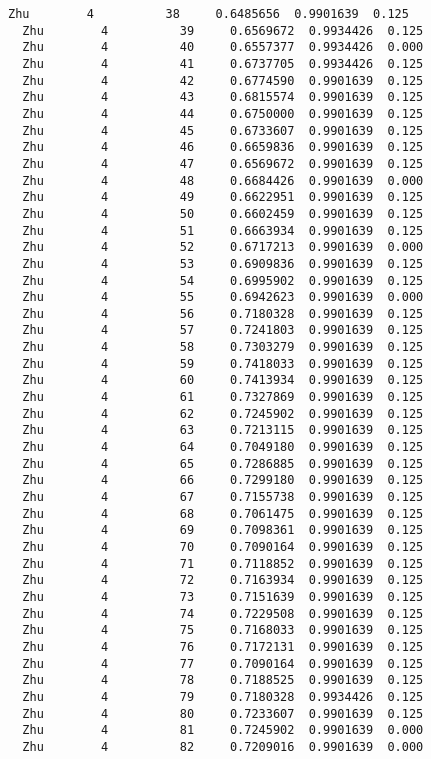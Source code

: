 \documentclass[11pt]{article}
\begin{document}
\begin{Verbatim}[commandchars=\\\{\}]
  Zhu        4          38     0.6485656  0.9901639  0.125
  Zhu        4          39     0.6569672  0.9934426  0.125
  Zhu        4          40     0.6557377  0.9934426  0.000
  Zhu        4          41     0.6737705  0.9934426  0.125
  Zhu        4          42     0.6774590  0.9901639  0.125
  Zhu        4          43     0.6815574  0.9901639  0.125
  Zhu        4          44     0.6750000  0.9901639  0.125
  Zhu        4          45     0.6733607  0.9901639  0.125
  Zhu        4          46     0.6659836  0.9901639  0.125
  Zhu        4          47     0.6569672  0.9901639  0.125
  Zhu        4          48     0.6684426  0.9901639  0.000
  Zhu        4          49     0.6622951  0.9901639  0.125
  Zhu        4          50     0.6602459  0.9901639  0.125
  Zhu        4          51     0.6663934  0.9901639  0.125
  Zhu        4          52     0.6717213  0.9901639  0.000
  Zhu        4          53     0.6909836  0.9901639  0.125
  Zhu        4          54     0.6995902  0.9901639  0.125
  Zhu        4          55     0.6942623  0.9901639  0.000
  Zhu        4          56     0.7180328  0.9901639  0.125
  Zhu        4          57     0.7241803  0.9901639  0.125
  Zhu        4          58     0.7303279  0.9901639  0.125
  Zhu        4          59     0.7418033  0.9901639  0.125
  Zhu        4          60     0.7413934  0.9901639  0.125
  Zhu        4          61     0.7327869  0.9901639  0.125
  Zhu        4          62     0.7245902  0.9901639  0.125
  Zhu        4          63     0.7213115  0.9901639  0.125
  Zhu        4          64     0.7049180  0.9901639  0.125
  Zhu        4          65     0.7286885  0.9901639  0.125
  Zhu        4          66     0.7299180  0.9901639  0.125
  Zhu        4          67     0.7155738  0.9901639  0.125
  Zhu        4          68     0.7061475  0.9901639  0.125
  Zhu        4          69     0.7098361  0.9901639  0.125
  Zhu        4          70     0.7090164  0.9901639  0.125
  Zhu        4          71     0.7118852  0.9901639  0.125
  Zhu        4          72     0.7163934  0.9901639  0.125
  Zhu        4          73     0.7151639  0.9901639  0.125
  Zhu        4          74     0.7229508  0.9901639  0.125
  Zhu        4          75     0.7168033  0.9901639  0.125
  Zhu        4          76     0.7172131  0.9901639  0.125
  Zhu        4          77     0.7090164  0.9901639  0.125
  Zhu        4          78     0.7188525  0.9901639  0.125
  Zhu        4          79     0.7180328  0.9934426  0.125
  Zhu        4          80     0.7233607  0.9901639  0.125
  Zhu        4          81     0.7245902  0.9901639  0.000
  Zhu        4          82     0.7209016  0.9901639  0.000

\end{Verbatim}
\end{document}
